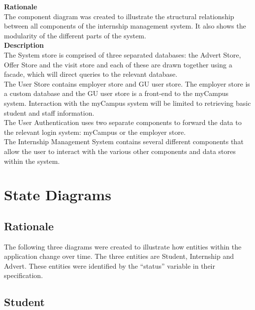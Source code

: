 \documentclass{l3deliverable}
\begin{document}
\textbf{Rationale}\\
The component diagram was created to illustrate the structural relationship between all components of the internship management system. It also shows the modularity of the different parts of the system.\\

\textbf{Description}\\

The System store is comprised of three separated databases: the Advert Store, Offer Store and the visit store and each of these are drawn together using a facade, which will direct queries to the relevant database. \\

The User Store contains employer store and GU user store. The employer store is a custom database and the GU user store is a front-end to the myCampus system. Interaction with the myCampus system will be limited to retrieving basic student and staff information.\\

The User Authentication uses two separate components to forward the data to the relevant login system: myCampus or the employer store. \\

The Internship Management System contains several different components that allow the user to interact with the various other components and data stores within the system.\\



\section{State Diagrams}

\subsection{Rationale}

The following three diagrams were created to illustrate how entities within the application change over time. The three entities are Student, Internship and Advert. These entities were identified by the ``status'' variable in their specification. \\

\subsection{Student}
\end{document}
